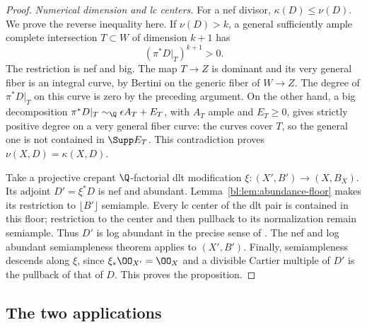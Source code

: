 \begin{proof}
\smallskip\noindent
\emph{Numerical dimension and lc centers.}
For a nef divisor, $\kappa(D)\leq\nu(D)$.  We prove the reverse
inequality here.  If $\nu(D)>k$, a general sufficiently ample
complete intersection $T\subset W$ of dimension $k+1$ has
\[
 (\pi^*D|_T)^{k+1}>0.
\]
The restriction is nef and big.  The map $T\to Z$ is dominant
and its very general fiber is an integral curve, by Bertini
on the generic fiber of $W\to Z$.  The degree of $\pi^*D|_T$
on this curve is zero by the preceding argument.  On the other
hand, a big decomposition
$\pi^*D|_T\sim_{\Q}\epsilon A_T+E_T$, with $A_T$ ample and
$E_T\geq0$, gives strictly positive degree on a very general
fiber curve: the curves cover $T$, so the general one is not
contained in $\Supp E_T$.  This contradiction proves
$\nu(X,D)=\kappa(X,D)$.

Take a projective crepant $\Q$-factorial dlt modification
$\xi:(X',B')\to(X,B_X)$.  Its adjoint $D'=\xi^*D$ is nef
and abundant.  Lemma~\ref{bl:lem:abundance-floor} makes its
restriction to $\lfloor B'\rfloor$ semiample.  Every lc center
of the dlt pair is contained in this floor; restriction to the
center and then pullback to its normalization remain semiample.
Thus $D'$ is log abundant in the precise sense of
\cite[Definition~4.1]{FujinoGongyo2014}.  The nef and log abundant
semiampleness theorem
\cite[Theorem~4.2, equivalently Theorem~1.6]{FujinoGongyo2014}
applies to $(X',B')$.  Finally, semiampleness descends along
$\xi$, since $\xi_*\OO_{X'}=\OO_X$ and a divisible Cartier
multiple of $D'$ is the pullback of that of $D$.  This proves
the proposition.
\end{proof}

\subsection{The two applications}

